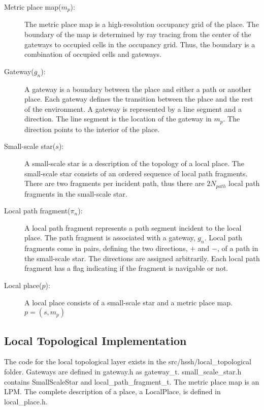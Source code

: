 \documentclass{article}
\begin{document}
\begin{description}
    \item[Metric place map($m_p$):] The metric place map is a high-resolution occupancy grid of the place. The boundary
    of the map is determined by ray tracing from the center of the gateways to occupied cells in the occupancy grid.
    Thus, the boundary is a combination of occupied cells and gateways.

    \item[Gateway($g_n$):] A gateway is a boundary between the place and either a path or another place. Each gateway
    defines the transition between the place and the rest of the environment. A gateway is represented by a line segment
    and a direction. The line segment is the location of the gateway in $m_p$. The direction points to the interior of
    the place.

    \item[Small-scale star($s$):] A small-scale star is a description of the topology of a local place. The small-scale
    star consists of an ordered sequence of local path fragments. There are two fragments per incident path, thus there
    are $2N_{path}$ local path fragments in the small-scale star.

    \item[Local path fragment($\pi_n$):] A local path fragment represents a path segment incident to the local place.
    The path fragment is associated with a gateway, $g_n$. Local path fragments come in pairs, defining the two
    directions, $+$ and $-$, of a path in the small-scale star. The directions are assigned arbitrarily. Each local path
    fragment has a flag indicating if the fragment is navigable or not.

    \item[Local place($p$):] A local place consists of a small-scale star and a metric place map. $p = (s, m_p)$
\end{description}

\subsection{Local Topological Implementation}
The code for the local topological layer exists in the src/hssh/local\_topological folder. Gateways are defined in
gateway.h as gateway\_t. small\_scale\_star.h contains SmallScaleStar and local\_path\_fragment\_t. The metric place map
is an LPM. The complete description of a place, a LocalPlace, is defined in local\_place.h.
\end{document}
